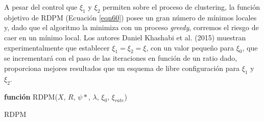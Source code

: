 A pesar del control que $\xi_1$ y $\xi_2$ permiten sobre el proceso de clustering, la función objetivo de \acs{RDPM} (Ecuación \ref{eqn60}) posee un gran número de mínimos locales y, dado que el algoritmo la minimiza con un proceso \textit{greedy}, corremos el riesgo de caer en un mínimo local. Los autores Daniel Khashabi et al. (2015) \cite{RDPM:2015} muestran experimentalmente que establecer $\xi_1 = \xi_2 = \xi$, con un valor pequeño para $\xi_0$, que se incrementará con el paso de las iteraciones en función de un ratio dado, proporciona mejores resultados que un esquema de libre configuración para $\xi_1$ y $\xi_2$.

\begin{algorithm}
	\BlankLine
	\BlankLine
	\textbf{función} RDPM($X$, $R$, $\psi*$, $\lambda$, $\xi_0$, $\xi_{rate}$) 
	\caption{\acf{RDPM}}
	\label{alg:rdpm}
\end{algorithm}










